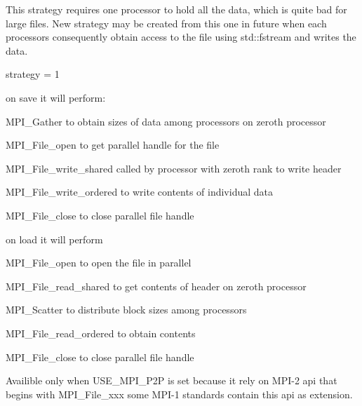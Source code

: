 This strategy requires one processor to hold all the data, which is quite bad for large files. New strategy may be created from this one in future when each processors consequently obtain access to the file using std\-::fstream and writes the data.

strategy = 1
\begin{DoxyItemize}
\item on save it will perform\-:
\begin{DoxyEnumerate}
\item M\-P\-I\-\_\-\-Gather to obtain sizes of data among processors on zeroth processor
\item M\-P\-I\-\_\-\-File\-\_\-open to get parallel handle for the file
\item M\-P\-I\-\_\-\-File\-\_\-write\-\_\-shared called by processor with zeroth rank to write header
\item M\-P\-I\-\_\-\-File\-\_\-write\-\_\-ordered to write contents of individual data
\item M\-P\-I\-\_\-\-File\-\_\-close to close parallel file handle
\end{DoxyEnumerate}
\item on load it will perform
\begin{DoxyEnumerate}
\item M\-P\-I\-\_\-\-File\-\_\-open to open the file in parallel
\item M\-P\-I\-\_\-\-File\-\_\-read\-\_\-shared to get contents of header on zeroth processor
\item M\-P\-I\-\_\-\-Scatter to distribute block sizes among processors
\item M\-P\-I\-\_\-\-File\-\_\-read\-\_\-ordered to obtain contents
\item M\-P\-I\-\_\-\-File\-\_\-close to close parallel file handle
\end{DoxyEnumerate}

Availible only when U\-S\-E\-\_\-\-M\-P\-I\-\_\-\-P2\-P is set because it rely on M\-P\-I-\/2 api that begins with M\-P\-I\-\_\-\-File\-\_\-xxx some M\-P\-I-\/1 standards contain this api as extension.
\end{DoxyItemize}

